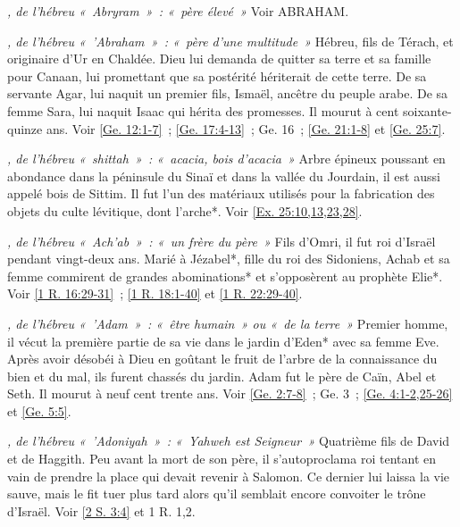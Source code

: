 \begin{multicols}{2}
\textit{, de l'hébreu «~Abryram~»~: «~père élevé~»}\newline
Voir ABRAHAM.

\textit{, de l'hébreu «~'Abraham~»~: «~père d'une multitude~»}\newline
Hébreu, fils de Térach, et originaire d'Ur en Chaldée. Dieu lui demanda de quitter sa terre et sa famille pour Canaan, lui promettant que sa postérité hériterait de cette terre. De sa servante Agar, lui naquit un premier fils, Ismaël, ancêtre du peuple arabe. De sa femme Sara, lui naquit Isaac qui hérita des promesses. Il mourut à cent soixante-quinze ans.\newline
Voir \vref{Ge. 12:1-7}~; \vref{Ge. 17:4-13}~; Ge. 16~; \vref{Ge. 21:1-8} et \vref{Ge. 25:7}.

\textit{, de l'hébreu «~shittah~»~: «~acacia, bois d'acacia~»}\newline
Arbre épineux poussant en abondance dans la péninsule du Sinaï et dans la vallée du Jourdain, il est aussi appelé bois de Sittim. Il fut l'un des matériaux utilisés pour la fabrication des objets du culte lévitique, dont l'arche*.\newline
Voir \vref{Ex. 25:10,13,23,28}.

\textit{, de l'hébreu «~Ach'ab~»~: «~un frère du père~»}\newline
Fils d'Omri, il fut roi d'Israël pendant vingt-deux ans. Marié à Jézabel*, fille du roi des Sidoniens, Achab et sa femme commirent de grandes abominations* et s'opposèrent au prophète Elie*.\newline
Voir \vref{1 R. 16:29-31}~; \vref{1 R. 18:1-40} et \vref{1 R. 22:29-40}.

\textit{, de l'hébreu «~'Adam~»~: «~être humain~» ou «~de la terre~»}\newline
Premier homme, il vécut la première partie de sa vie dans le jardin d'Eden* avec sa femme Eve. Après avoir désobéi à Dieu en goûtant le fruit de l'arbre de la connaissance du bien et du mal, ils furent chassés du jardin. Adam fut le père de Caïn, Abel et Seth. Il mourut à neuf cent trente ans.\newline
Voir \vref{Ge. 2:7-8}~; Ge. 3~; \vref{Ge. 4:1-2,25-26} et \vref{Ge. 5:5}.

\textit{, de l'hébreu «~'Adoniyah~»~: «~Yahweh est Seigneur~»}\newline
Quatrième fils de David et de Haggith. Peu avant la mort de son père, il s'autoproclama roi tentant en vain de prendre la place qui devait revenir à Salomon. Ce dernier lui laissa la vie sauve, mais le fit tuer plus tard alors qu'il semblait encore convoiter le trône d'Israël.\newline
Voir \vref{2 S. 3:4} et 1 R. 1,2.


\end{multicols}
